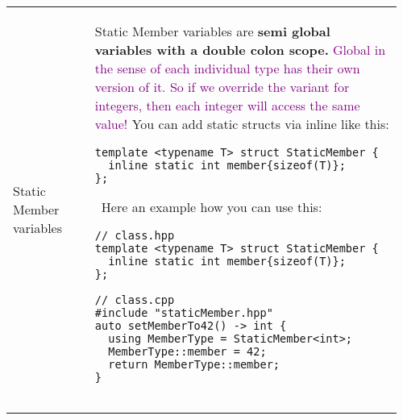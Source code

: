\documentclass[main.tex,fontsize=8pt,paper=a4,paper=portrait,DIV=calc,]{scrartcl}
\begin{document}
\begin{table}[ht!]
\begin{tabular}{|m{0.2\linewidth}|m{0.755\linewidth}|}
\hline
Static Member variables &
Static Member variables are \textbf{semi global variables with a double colon scope.}\newline
\textcolor{purple}{Global in the sense of each individual type has their own version of it. So if we override the variant for integers, then each integer will access the same value!}\newline
You can add static structs via inline like this: \newline
\begin{lstlisting}
template <typename T> struct StaticMember {
  inline static int member{sizeof(T)};
};
\end{lstlisting}
\, \newline
Here an example how you can use this: \newline
\begin{lstlisting}
// class.hpp
template <typename T> struct StaticMember {
  inline static int member{sizeof(T)};
};

// class.cpp
#include "staticMember.hpp"
auto setMemberTo42() -> int {
  using MemberType = StaticMember<int>;
  MemberType::member = 42;
  return MemberType::member;
}


\end{lstlisting}
\end{tabular}
\end{table}
\end{document}
